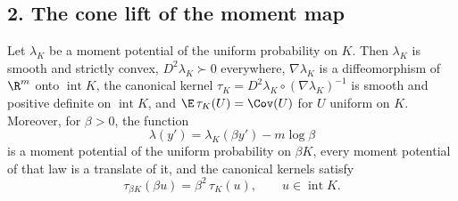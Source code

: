\documentclass[../main.tex]{subfiles}
\begin{document}
\subsection*{2. The cone lift of the moment map}
\label{subsec:sol-cone-lift}

\begin{lemma}
\label{lem:sol-cone-base}
Let $\lambda_K$ be a moment potential of the uniform probability on $K$.  Then $\lambda_K$ is
smooth and strictly convex, $D^2\lambda_K\succ0$ everywhere, $\nabla\lambda_K$ is a
diffeomorphism of $\R^m$ onto $\operatorname{int}K$, the canonical kernel
$\tau_K=D^2\lambda_K\circ(\nabla\lambda_K)^{-1}$ is smooth and positive definite on
$\operatorname{int}K$, and $\E\,\tau_K(U)=\Cov(U)$ for $U$ uniform on $K$.  Moreover, for
$\beta>0$, the function
\begin{equation}
  \lambda(y')=\lambda_K(\beta y')-m\log\beta
  \label{eq:sol-cone-rescaled}
\end{equation}
is a moment potential of the uniform probability on $\beta K$, every moment potential of that
law is a translate of it, and the canonical kernels satisfy
\begin{equation}
  \tau_{\beta K}(\beta u)=\beta^2\,\tau_K(u),\qquad u\in\operatorname{int}K .
  \label{eq:sol-cone-scaling}
\end{equation}
\end{lemma}
\end{document}
